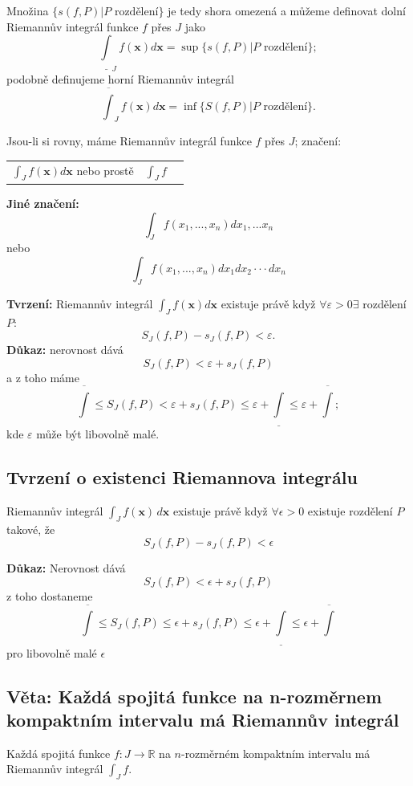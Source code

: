 \documentclass[10pt]{article}
\begin{document}
Množina $\{s(f,P) | P \text{ rozdělení}\}$ je tedy shora omezená a můžeme definovat dolní Riemannův integrál funkce $f$ přes $J$ jako
\[\underline{\int}_J f(\textbf{x})d\textbf{x} = \sup\{s(f,P) | P \text{ rozdělení}\};\]
podobně definujeme horní Riemannův integrál
\[\overline{\int}_J f(\textbf{x})d\textbf{x} = \inf\{S(f,P) | P \text{ rozdělení}\}.\]

Jsou-li si rovny, máme Riemannův integrál funkce $f$ přes $J$; značení:
\begin{center}
\begin{tabular}{c c c}
    $\int_J f(\textbf{x})d\textbf{x}$ nebo prostě & $\int_J f $\\
\end{tabular}
\end{center}

\textbf{Jiné značení:}
\[\int_J f(x_1,...,x_n)dx_1,...x_n\]
nebo
\[\int_J f(x_1,...,x_n)dx_1 dx_2\cdot \cdot \cdot dx_n\]

\textbf{Tvrzení:} Riemannův integrál $\int_J f(\textbf{x})d\textbf{x}$ existuje právě když $\forall \varepsilon > 0 \exists$ rozdělení $P : $
\[S_J(f,P) - s_J(f,P) < \varepsilon.\]
\vspace{5mm}
\noindent
\textbf{Důkaz:} nerovnost dává
\[S_J(f,P) < \varepsilon + s_J(f,P)\]
a z toho máme
\[\overline{\int} \leq S_J(f,P) < \varepsilon + s_J(f,P) \leq \varepsilon + \underline{\int} \leq \varepsilon + \overline{\int};\]
kde $\varepsilon$ může být libovolně malé.
\subsection{Tvrzení o existenci Riemannova integrálu}
\hspace{1.2mm}
Riemannův integrál $\int_{J} f(\mathbf{x}) \,d\mathbf{x}$ existuje právě když
$\forall \epsilon > 0$ existuje rozdělení $P$ takové, že
\[ S_J(f,P) - s_J(f,P) < \epsilon \]

\vspace{5mm}
\noindent
\textbf{Důkaz:}
Nerovnost dává \[ S_J(f,P) < \epsilon + s_J(f,P) \]
z toho dostaneme
\[ \overline{\int} \leq S_J(f,P) \leq \epsilon + s_J(f,P) \leq \epsilon + \underline{\int} \leq
\epsilon + \overline{\int}\]
pro libovolně malé $\epsilon$

\subsection{Věta: Každá spojitá funkce na n-rozměrnem kompaktním intervalu má Riemannův integrál}
\hspace{1.2mm}
Každá spojitá funkce $f: J \to \mathbb{R}$ na $n$-rozměrném kompaktním intervalu má Riemannův integrál
$\int_{J}f$.
\end{document}
